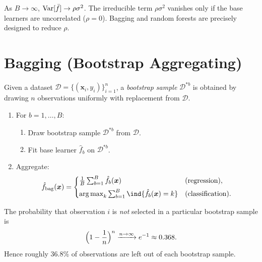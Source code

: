 \begin{remark}
As $B\to\infty$, $\mathrm{Var}[\bar f]\to\rho\sigma^2$. The irreducible term $\rho\sigma^2$ vanishes only if the base learners are uncorrelated ($\rho=0$). Bagging and random forests are precisely designed to reduce $\rho$.
\end{remark}

\section{Bagging (Bootstrap Aggregating)}

\begin{definition}
Given a dataset $\mathcal{D}=\{(\bm{x}_i,y_i)\}_{i=1}^n$, a \emph{bootstrap sample} $\mathcal{D}^{*b}$ is obtained by drawing $n$ observations uniformly with replacement from $\mathcal{D}$.
\end{definition}

\begin{algorithme}[title=\textbf{Bagging}]
\begin{enumerate}
  \item For $b=1,\dots,B$:
    \begin{enumerate}
      \item Draw bootstrap sample $\mathcal{D}^{*b}$ from $\mathcal{D}$.
      \item Fit base learner $\hat f_b$ on $\mathcal{D}^{*b}$.
    \end{enumerate}
  \item Aggregate:
    \[
      \hat f_{\text{bag}}(\bm{x}) =
      \begin{cases}
        \frac{1}{B}\sum_{b=1}^B \hat f_b(\bm{x}) & \text{(regression)},\\[4pt]
        \argmax_k \sum_{b=1}^B \ind\{\hat f_b(\bm{x})=k\} & \text{(classification)}.
      \end{cases}
    \]
\end{enumerate}
\end{algorithme}

\begin{proposition}
The probability that observation $i$ is \emph{not} selected in a particular bootstrap sample is
\[
  \Bigl(1-\frac{1}{n}\Bigr)^n \xrightarrow{n\to\infty} e^{-1}\approx 0.368.
\]
Hence roughly 36.8\% of observations are left out of each bootstrap sample.
\end{proposition}

